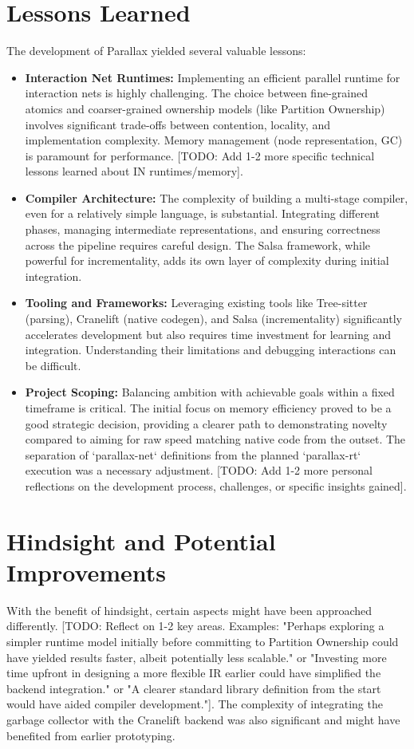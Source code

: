 \section{Lessons Learned} %
The development of Parallax yielded several valuable lessons:
\begin{itemize}
    \item \textbf{Interaction Net Runtimes:} Implementing an efficient parallel runtime for interaction nets is highly challenging. The choice between fine-grained atomics and coarser-grained ownership models (like Partition Ownership) involves significant trade-offs between contention, locality, and implementation complexity. Memory management (node representation, GC) is paramount for performance. [TODO: Add 1-2 more specific technical lessons learned about IN runtimes/memory].
    \item \textbf{Compiler Architecture:} The complexity of building a multi-stage compiler, even for a relatively simple language, is substantial. Integrating different phases, managing intermediate representations, and ensuring correctness across the pipeline requires careful design. The Salsa framework, while powerful for incrementality, adds its own layer of complexity during initial integration.
    \item \textbf{Tooling and Frameworks:} Leveraging existing tools like Tree-sitter (parsing), Cranelift (native codegen), and Salsa (incrementality) significantly accelerates development but also requires time investment for learning and integration. Understanding their limitations and debugging interactions can be difficult.
    \item \textbf{Project Scoping:} Balancing ambition with achievable goals within a fixed timeframe is critical. The initial focus on memory efficiency proved to be a good strategic decision, providing a clearer path to demonstrating novelty compared to aiming for raw speed matching native code from the outset. The separation of `parallax-net` definitions from the planned `parallax-rt` execution was a necessary adjustment. [TODO: Add 1-2 more personal reflections on the development process, challenges, or specific insights gained].
\end{itemize}

\section{Hindsight and Potential Improvements} %
With the benefit of hindsight, certain aspects might have been approached differently. [TODO: Reflect on 1-2 key areas. Examples: "Perhaps exploring a simpler runtime model initially before committing to Partition Ownership could have yielded results faster, albeit potentially less scalable." or "Investing more time upfront in designing a more flexible IR earlier could have simplified the backend integration." or "A clearer standard library definition from the start would have aided compiler development."]. The complexity of integrating the garbage collector with the Cranelift backend was also significant and might have benefited from earlier prototyping.

